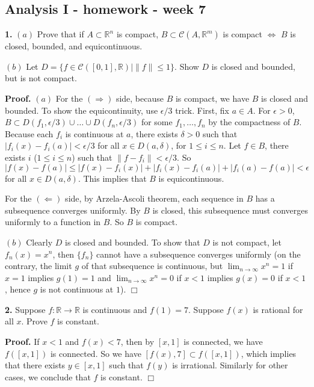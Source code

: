 \documentclass{article}
\begin{document}
    
    
    
    
    

    
    \subsection*{Analysis I - homework - week
7}\label{analysis-i---homework---week-7}

    \textbf{1.} $(a)$ Prove that if $A\subset \mathbb{R}^n$ is compact,
$B \subset\mathcal{C}(A, \mathbb{R}^m)$ is compact $\Leftrightarrow$ $B$
is closed, bounded, and equicontinuous.

$(b)$ Let $D = \{f \in\mathcal{C}([0,1], \mathbb{R}) \mid \|f\|\le 1\}$.
Show $D$ is closed and bounded, but is not compact.

\textbf{Proof.} $(a)$ For the $(\Rightarrow)$ side, because $B$ is
compact, we have $B$ is closed and bounded. To show the equicontinuity,
use $\epsilon/3$ trick. First, fix $a\in A$. For $\epsilon >0$,
$B \subset D(f_1,\epsilon/3)\cup \ldots \cup D(f_n,\epsilon/3)$ for some
$f_1,\ldots,f_n$ by the compactness of $B$. Because each $f_i$ is
continuous at $a$, there exists $\delta > 0$ such that
$|f_i(x) - f_i(a)| < \epsilon/3$ for all $x\in D(a,\delta)$, for
$1\le i \le n$. Let $f \in B$, there exists $i$ ($1\le i \le n$) such
that $\|f - f_i\| < \epsilon/3$. So
\[|f(x) - f(a)| \le |f(x) - f_i(x)| + |f_i(x) - f_i(a)| + |f_i(a) - f(a)| < \epsilon\]
for all $x\in D(a,\delta)$. This implies that $B$ is equicontinuous.

For the $(\Leftarrow)$ side, by Arzela-Ascoli theorem, each sequence in
$B$ has a subsequence converges uniformly. By $B$ is closed, this
subsequence must converges uniformly to a function in $B$. So $B$ is
compact.

$(b)$ Clearly $D$ is closed and bounded. To show that $D$ is not
compact, let $f_n(x) = x^n$, then $\{f_n\}$ cannot have a subsequence
converges uniformly (on the contrary, the limit $g$ of that subsequence
is continuous, but $\lim_{n\to\infty}x^n = 1$ if $x =1$ implies
$g(1) =1$ and $\lim_{n\to\infty}x^n = 0$ if $x < 1$ implies $g(x) = 0$
if $x < 1$, hence $g$ is not continuous at $1$). $\Box$

    \textbf{2.} Suppose $f:\mathbb{R}\to\mathbb{R}$ is continuous and
$f(1) = 7$. Suppose $f(x)$ is rational for all $x$. Prove $f$ is
constant.

\textbf{Proof.} If $x < 1$ and $f(x) < 7$, then by $[x,1]$ is connected,
we have $f([x,1])$ is connected. So we have
$[f(x) , 7] \subset f([x,1])$, which implies that there exists
$y\in [x,1]$ such that $f(y)$ is irrational. Similarly for other cases,
we conclude that $f$ is constant. $\Box$
\end{document}
